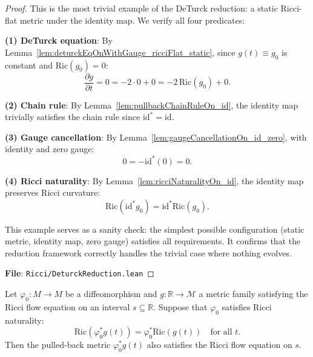 \begin{proof}
\leanok
{}
This is the most trivial example of the DeTurck reduction: a static Ricci-flat metric under the identity map. We verify all four predicates:

\textbf{(1) DeTurck equation}: By Lemma~\ref{lem:deturckEqOnWithGauge_ricciFlat_static}, since $g(t) \equiv g_0$ is constant and $\mathrm{Ric}(g_0) = 0$:
\[
\frac{\partial g}{\partial t} = 0 = -2 \cdot 0 + 0 = -2\,\mathrm{Ric}(g_0) + 0.
\]

\textbf{(2) Chain rule}: By Lemma~\ref{lem:pullbackChainRuleOn_id}, the identity map trivially satisfies the chain rule since $\mathrm{id}^* = \mathrm{id}$.

\textbf{(3) Gauge cancellation}: By Lemma~\ref{lem:gaugeCancellationOn_id_zero}, with identity and zero gauge:
\[
0 = -\mathrm{id}^*(0) = 0.
\]

\textbf{(4) Ricci naturality}: By Lemma~\ref{lem:ricciNaturalityOn_id}, the identity map preserves Ricci curvature:
\[
\mathrm{Ric}(\mathrm{id}^* g_0) = \mathrm{id}^*\mathrm{Ric}(g_0).
\]

This example serves as a sanity check: the simplest possible configuration (static metric, identity map, zero gauge) satisfies all requirements. It confirms that the reduction framework correctly handles the trivial case where nothing evolves.

\textbf{File}: \texttt{Ricci/DeturckReduction.lean}
\end{proof}

\begin{theorem}
\label{thm:const_diff_reduction}
\leanok
Let $\varphi_0 : M \to M$ be a diffeomorphism and $g : \mathbb{R} \to \mathcal{M}$ a metric family satisfying the Ricci flow equation on an interval $s \subseteq \mathbb{R}$. Suppose that $\varphi_0$ satisfies Ricci naturality:
\[
\mathrm{Ric}(\varphi_0^* g(t)) = \varphi_0^* \mathrm{Ric}(g(t)) \quad \text{for all } t.
\]
Then the pulled-back metric $\varphi_0^* g(t)$ also satisfies the Ricci flow equation on $s$.
\end{theorem}

